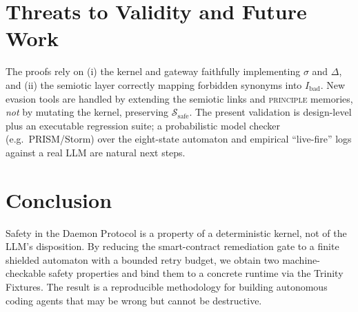 \documentclass{article}
\theoremstyle{plain}
\theoremstyle{definition}
\begin{document}
\section{Threats to Validity and Future Work}
The proofs rely on (i) the kernel and gateway faithfully implementing
$\sigma$ and $\Delta$, and (ii) the semiotic layer correctly mapping forbidden
synonyms into $I_{\text{bad}}$. New evasion tools are handled by extending the
semiotic links and \textsc{principle} memories, \emph{not} by mutating the
kernel, preserving $\mathcal{S}_{\text{safe}}$. The present validation is
design-level plus an executable regression suite; a probabilistic model checker
(e.g.\ PRISM/Storm) over the eight-state automaton and empirical ``live-fire''
logs against a real LLM are natural next steps.

\section{Conclusion}
Safety in the Daemon Protocol is a property of a deterministic kernel, not of the
LLM's disposition. By reducing the smart-contract remediation gate to a finite
shielded automaton with a bounded retry budget, we obtain two machine-checkable
safety properties and bind them to a concrete runtime via the Trinity Fixtures.
The result is a reproducible methodology for building autonomous coding agents
that may be wrong but cannot be destructive.
\end{document}

